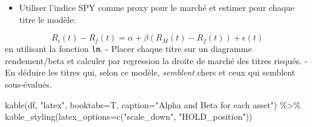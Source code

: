 \documentclass[
]{article}
\newenvironment{Shaded}{\begin{snugshade}}{\end{snugshade}}
\newcommand{\AttributeTok}[1]{\textcolor[rgb]{0.77,0.63,0.00}{#1}}
\newcommand{\ControlFlowTok}[1]{\textcolor[rgb]{0.13,0.29,0.53}{\textbf{#1}}}
\newcommand{\DecValTok}[1]{\textcolor[rgb]{0.00,0.00,0.81}{#1}}
\newcommand{\FloatTok}[1]{\textcolor[rgb]{0.00,0.00,0.81}{#1}}
\newcommand{\FunctionTok}[1]{\textcolor[rgb]{0.00,0.00,0.00}{#1}}
\newcommand{\NormalTok}[1]{#1}
\newcommand{\OtherTok}[1]{\textcolor[rgb]{0.56,0.35,0.01}{#1}}
\newcommand{\SpecialCharTok}[1]{\textcolor[rgb]{0.00,0.00,0.00}{#1}}
\newcommand{\StringTok}[1]{\textcolor[rgb]{0.31,0.60,0.02}{#1}}
\providecommand{\tightlist}{%
  \setlength{\itemsep}{0pt}\setlength{\parskip}{0pt}}
\begin{document}
\begin{itemize}
\tightlist
\item
  Utiliser l'indice SPY comme proxy pour le marché et estimer pour
  chaque titre le modèle:
\end{itemize}

\[
R_i(t) - R_f(t) = \alpha + \beta (R_M(t) - R_f(t)) + \epsilon(t)
\] en utilisant la fonction \texttt{lm}. - Placer chaque titre sur un
diagramme rendement/beta et calculer par regression la droite de marché
des titres risqués. - En déduire les titres qui, selon ce modèle,
\emph{semblent} chers et ceux qui semblent sous-évalués.

\begin{Shaded}
\end{Shaded}

\begin{Shaded}
\begin{Highlighting}[]
\FunctionTok{kable}\NormalTok{(df, }\StringTok{"latex"}\NormalTok{, }\AttributeTok{booktabs=}\NormalTok{T, }\AttributeTok{caption=}\StringTok{"Alpha and Beta for each asset"}\NormalTok{) }\SpecialCharTok{\%\textgreater{}\%}
\FunctionTok{kable\_styling}\NormalTok{(}\AttributeTok{latex\_options=}\FunctionTok{c}\NormalTok{(}\StringTok{"scale\_down"}\NormalTok{, }\StringTok{"HOLD\_position"}\NormalTok{))}
\end{Highlighting}
\end{Shaded}
\end{document}
